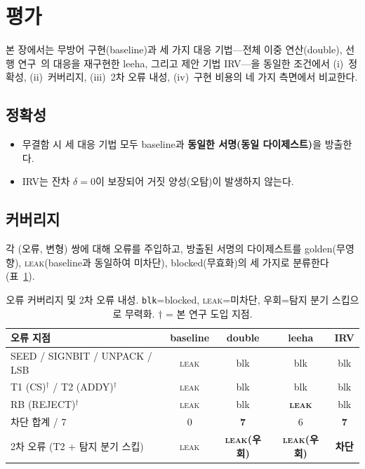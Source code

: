 \section{평가}
\label{sec:eval}

본 장에서는 무방어 구현(\textsf{baseline})과 세 가지 대응 기법---전체 이중 연산(\textsf{double}),
선행 연구~\cite{lee2026haetae}의 대응을 재구현한 \textsf{leeha}, 그리고 제안 기법
\textsf{IRV}---을 동일한 조건에서 (i)~정확성, (ii)~커버리지, (iii)~2차 오류 내성,
(iv)~구현 비용의 네 가지 측면에서 비교한다.

\subsection{정확성}
\begin{itemize}
  \item 무결함 시 세 대응 기법 모두 \textsf{baseline}과 \textbf{동일한 서명(동일 다이제스트)}을 방출한다.
  \item \textsf{IRV}는 잔차 $\delta=0$이 보장되어 거짓 양성(오탐)이 발생하지 않는다.
\end{itemize}

\subsection{커버리지}
\label{subsec:coverage}
각 (오류, 변형) 쌍에 대해 오류를 주입하고, 방출된 서명의 다이제스트를 golden(무영향),
\textsc{leak}(\textsf{baseline}과 동일하여 미차단), blocked(무효화)의 세 가지로 분류한다
(표~\ref{tab:coverage}).

\begin{table}[H]\centering
\caption{오류 커버리지 및 2차 오류 내성. \texttt{blk}=blocked, \textsc{leak}=미차단, 우회=탐지 분기
스킵으로 무력화. $\dagger$ = 본 연구 도입 지점.}
\label{tab:coverage}
\small
\begin{tabular}{@{}lcccc@{}}
\toprule
오류 지점 & baseline & \textsf{double} & \textsf{leeha} & \textsf{IRV} \\
\midrule
SEED / SIGNBIT / UNPACK / LSB & \textsc{leak} & blk & blk & blk \\
T1 (CS)$^\dagger$ / T2 (ADDY)$^\dagger$ & \textsc{leak} & blk & blk & blk \\
RB (REJECT)$^\dagger$ & \textsc{leak} & blk & \textbf{\textsc{leak}} & blk \\
\midrule
차단 합계 / 7 & 0 & \textbf{7} & 6 & \textbf{7} \\
\midrule
2차 오류 (T2 + 탐지 분기 스킵) & \textsc{leak} & \textbf{\textsc{leak}(우회)} & \textbf{\textsc{leak}(우회)} & \textbf{차단} \\
\bottomrule
\end{tabular}
\end{table}

